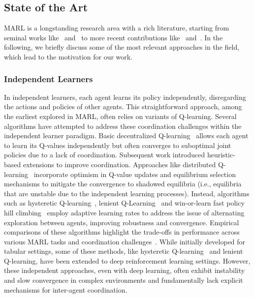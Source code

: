 \documentclass[sigconf]{acmart}
\begin{document}
\subsection{State of the Art}\label{sec:sota}
MARL is a longstanding research area with a rich literature, starting 
from seminal works like~\cite{tan1993multi} and~\cite{busoniu2008comprehensive} to more recent contributions like~\cite{gronauer2022multi} and~\cite{canese2021multi}.
%
In the following, we briefly discuss some of the most relevant approaches in the field, which lead to the motivation for our work.
\subsubsection{Independent Learners}
In independent learners, each agent learns its policy independently, disregarding the actions and policies of other agents. 
This straightforward approach, among the earliest explored in MARL, often relies on variants of Q-learning. 
%
Several algorithms have attempted to address these coordination challenges within the independent learner paradigm. 
Basic decentralized Q-learning~\cite{tan1993multi} allows each agent to learn its Q-values independently but often converges to suboptimal joint policies due to a lack of coordination. 
Subsequent work introduced heuristic-based extensions to improve coordination.
Approaches like distributed Q-learning~\cite{lauer2000algorithm} incorporate optimism in Q-value updates and equilibrium selection mechanisms to mitigate the convergence to shadowed equilibria (i.e., equilibria that are unstable due to the independent learning processes). 
Instead, algorithms such as hysteretic Q-learning~\cite{matignon2007hysteretic}, lenient Q-Learning~\cite{bloembergen2010lenient} and win-or-learn fast policy hill climbing~\cite{bowling2002multiagent} employ adaptive learning rates to address the issue of alternating exploration between agents, improving robustness and convergence.
%
Empirical comparisons of these algorithms highlight the trade-offs in performance across various MARL tasks and coordination challenges~\cite{matignon2012independent}. 
While initially developed for tabular settings, some of these methods, like hysteretic Q-learning~\cite{palmer2017lenient} and lenient Q-learning, have been extended to deep reinforcement learning settings. 
However, these independent approaches, even with deep learning, often exhibit instability and slow convergence in complex environments and fundamentally lack explicit mechanisms for inter-agent coordination. 
\end{document}
